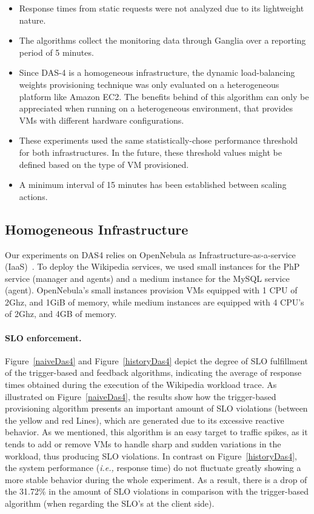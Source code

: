 \begin{itemize}
\item  Response times from static requests were not analyzed due to its lightweight nature. 

\item The algorithms collect the monitoring data through Ganglia over a reporting period of 5 minutes.

\item Since DAS-4 is a homogeneous infrastructure, the dynamic load-balancing weights provisioning technique was only evaluated on a heterogeneous platform like Amazon EC2. The benefits behind of this algorithm can only be appreciated when running on a heterogeneous environment, that provides VMs with different hardware configurations. 

\item These experiments used the same statistically-chose performance threshold for both infrastructures. In the future, these threshold values might be defined based on the type of VM provisioned. 

\item A minimum interval of 15 minutes has been established between scaling actions. 
\end{itemize}
\subsection*{Homogeneous Infrastructure}

Our experiments on DAS4 relies on OpenNebula as Infrastructure-as-a-service (IaaS)~\cite{sotomayor_virtual_2009}. To deploy the Wikipedia services, we used small instances for the PhP service (manager and agents) and a medium instance for the MySQL service (agent). OpenNebula's small instances provision VMs equipped with 1 CPU of 2Ghz, and 1GiB of memory, while medium instances are equipped with 4 CPU's of 2Ghz, and 4GB of memory.

\paragraph{SLO enforcement.}
Figure~\ref{naiveDas4} and Figure~\ref{historyDas4} depict the degree of SLO fulfillment of the trigger-based and feedback algorithms, indicating the average of response times obtained during the execution of the Wikipedia workload trace. As illustrated on Figure~\ref{naiveDas4}, the results show how the trigger-based provisioning algorithm presents an important amount of SLO violations (between the yellow and red Lines), which are generated due to its excessive reactive behavior. As we mentioned, this algorithm is an easy target to traffic spikes, as it tends to add or remove VMs to handle sharp and sudden variations in the workload, thus producing SLO violations. In contrast on Figure~\ref{historyDas4}, the system performance (\emph{i.e.,} response time) do not fluctuate greatly showing a more stable behavior during the whole experiment. As a result, there is a drop of the 31.72\% in the amount of SLO violations in comparison with the trigger-based algorithm (when regarding the SLO's at the client side). 


